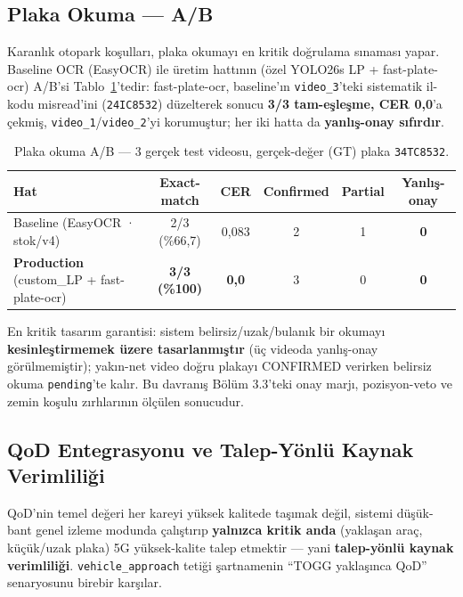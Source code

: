 \documentclass[12pt,a4paper]{article}
\newcommand{\tcode}[1]{\texttt{\small #1}}
\begin{document}
\subsection{Plaka Okuma — A/B}
Karanlık otopark koşulları, plaka okumayı en kritik doğrulama sınaması yapar. Baseline OCR (EasyOCR)
ile üretim hattının (özel YOLO26s LP + fast-plate-ocr) A/B'si Tablo~\ref{tab:plate}'tedir:
fast-plate-ocr, baseline'ın \tcode{video\_3}'teki sistematik il-kodu
misread'ini (\tcode{24IC8532}) düzelterek sonucu \textbf{3/3 tam-eşleşme, CER 0,0}'a çekmiş,
\tcode{video\_1}/\tcode{video\_2}'yi korumuştur; her iki hatta da \textbf{yanlış-onay sıfırdır}.

\begin{table}[H]\centering\small
\caption{Plaka okuma A/B — 3 gerçek test videosu, gerçek-değer (GT) plaka \tcode{34TC8532}.}\label{tab:plate}
\begin{tabularx}{\textwidth}{>{\raggedright\arraybackslash}X ccccc}
\toprule
\textbf{Hat} & \textbf{Exact-match} & \textbf{CER} & \textbf{Confirmed} & \textbf{Partial} & \textbf{Yanlış-onay} \\ \midrule
Baseline (EasyOCR · stok/v4) & 2/3 (\%66,7) & 0,083 & 2 & 1 & \textbf{0} \\
\textbf{Production} (custom\_LP + fast-plate-ocr) & \textbf{3/3 (\%100)} & \textbf{0,0} & 3 & 0 & \textbf{0} \\
\bottomrule
\end{tabularx}
\end{table}


En kritik tasarım garantisi: sistem belirsiz/uzak/bulanık bir okumayı \textbf{kesinleştirmemek üzere
tasarlanmıştır} (üç videoda yanlış-onay görülmemiştir); yakın-net video doğru plakayı CONFIRMED
verirken belirsiz okuma \tcode{pending}'te kalır. Bu davranış Bölüm 3.3'teki onay marjı, pozisyon-veto ve zemin koşulu zırhlarının
ölçülen sonucudur.

\subsection{QoD Entegrasyonu ve Talep-Yönlü Kaynak Verimliliği}
QoD'nin temel değeri her kareyi yüksek kalitede taşımak değil, sistemi düşük-bant genel izleme modunda
çalıştırıp \textbf{yalnızca kritik anda} (yaklaşan araç, küçük/uzak plaka) 5G yüksek-kalite talep
etmektir — yani \textbf{talep-yönlü kaynak verimliliği}. \tcode{vehicle\_approach} tetiği şartnamenin
``TOGG yaklaşınca QoD'' senaryosunu birebir karşılar.
\end{document}
